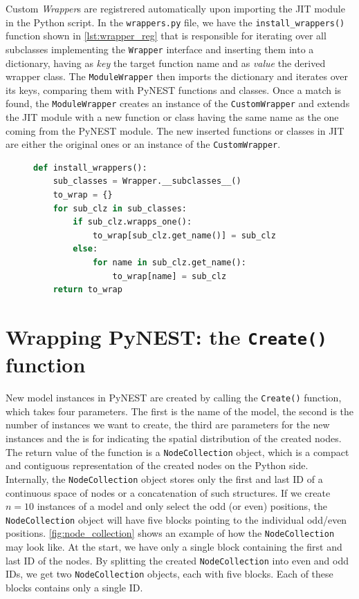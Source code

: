 Custom \emph{Wrapper}s are registrered automatically upon importing the JIT module in the Python script. In the \texttt{wrappers.py} file, we have the \texttt{install\_wrappers()} function shown in \autoref{lst:wrapper_reg} that is responsible for iterating over all subclasses implementing the \texttt{Wrapper} interface and inserting them into a dictionary, having as \emph{key} the target function name and as \emph{value} the derived wrapper class. The \texttt{ModuleWrapper} then imports the dictionary and iterates over its keys, comparing them with PyNEST functions and classes. Once a match is found, the \texttt{ModuleWrapper} creates an instance of the \texttt{CustomWrapper} and extends the JIT module with a new function or class having the same name as the one coming from the PyNEST module. The new inserted functions or classes in JIT are either the original ones or an instance of the \texttt{CustomWrapper}.

\begin{figure}[ht!]
    \centering
    \begin{lstlisting}[language=Python, label=lst:wrapper_reg, caption={Registering Wrappers}]
def install_wrappers():
    sub_classes = Wrapper.__subclasses__()
    to_wrap = {}
    for sub_clz in sub_classes:
        if sub_clz.wrapps_one():
            to_wrap[sub_clz.get_name()] = sub_clz
        else:
            for name in sub_clz.get_name():
                to_wrap[name] = sub_clz
    return to_wrap
\end{lstlisting}
\end{figure}

\section{Wrapping PyNEST: the \texttt{Create()} function}

New model instances in PyNEST are created by calling the \texttt{Create()} function, which takes four parameters. The first is the name of the model, the second is the number of instances we want to create, the third are parameters for the new instances and the is for indicating the spatial distribution of the created nodes. The return value of the function is a \texttt{NodeCollection} object, which is a compact and contiguous representation of the created nodes on the Python side. Internally, the \texttt{NodeCollection} object stores only the first and last ID of a continuous space of nodes or a concatenation of such structures. If we create $n=10$ instances of a model and only select the odd (or even) positions, the \texttt{NodeCollection} object will have five blocks pointing to the individual odd/even positions. \autoref{fig:node_collection} shows an example of how the \texttt{NodeCollection} may look like. At the start, we have only a single block containing the first and last ID of the nodes. By splitting the created \texttt{NodeCollection} into even and odd IDs, we get two \texttt{NodeCollection} objects, each with five blocks. Each of these blocks contains only a single ID.

